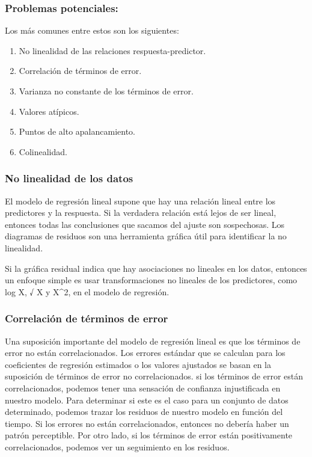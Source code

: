 \documentclass[
  letterpaper,
  DIV=11,
  numbers=noendperiod]{scrartcl}
\providecommand{\tightlist}{%
  \setlength{\itemsep}{0pt}\setlength{\parskip}{0pt}}\usepackage{longtable,booktabs,array}
\begin{document}
\hypertarget{problemas-potenciales}{%
\subsubsection{\texorpdfstring{\textbf{Problemas
potenciales:}}{Problemas potenciales:}}\label{problemas-potenciales}}

Los más comunes entre estos son los siguientes:

\begin{enumerate}
\def\labelenumi{\arabic{enumi}.}
\tightlist
\item
  No linealidad de las relaciones respuesta-predictor.
\item
  Correlación de términos de error.
\item
  Varianza no constante de los términos de error.
\item
  Valores atípicos.
\item
  Puntos de alto apalancamiento.
\item
  Colinealidad.
\end{enumerate}

\hypertarget{no-linealidad-de-los-datos}{%
\subsubsection{\texorpdfstring{\textbf{No linealidad de los
datos}}{No linealidad de los datos}}\label{no-linealidad-de-los-datos}}

El modelo de regresión lineal supone que hay una relación lineal entre
los predictores y la respuesta. Si la verdadera relación está lejos de
ser lineal, entonces todas las conclusiones que sacamos del ajuste son
sospechosas. Los diagramas de residuos son una herramienta gráfica útil
para identificar la no linealidad.

Si la gráfica residual indica que hay asociaciones no lineales en los
datos, entonces un enfoque simple es usar transformaciones no lineales
de los predictores, como log X, √ X y X\^{}2, en el modelo de regresión.

\hypertarget{correlaciuxf3n-de-tuxe9rminos-de-error}{%
\subsubsection{\texorpdfstring{\textbf{Correlación de términos de
error}}{Correlación de términos de error}}\label{correlaciuxf3n-de-tuxe9rminos-de-error}}

Una suposición importante del modelo de regresión lineal es que los
términos de error no están correlacionados. Los errores estándar que se
calculan para los coeficientes de regresión estimados o los valores
ajustados se basan en la suposición de términos de error no
correlacionados. si los términos de error están correlacionados, podemos
tener una sensación de confianza injustificada en nuestro modelo. Para
determinar si este es el caso para un conjunto de datos determinado,
podemos trazar los residuos de nuestro modelo en función del tiempo. Si
los errores no están correlacionados, entonces no debería haber un
patrón perceptible. Por otro lado, si los términos de error están
positivamente correlacionados, podemos ver un seguimiento en los
residuos.
\end{document}
